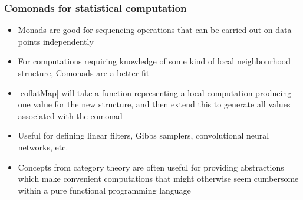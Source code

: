 \documentclass[mathserif,handout]{beamer}
\begin{document}
\begin{frame}[fragile]
  \frametitle{Comonads for statistical computation}
  \begin{itemize}
  \item Monads are good for sequencing operations that can be carried out on data points independently
    \item For computations requiring knowledge of some kind of local neighbourhood structure, \alert{Comonads} are a better fit
    \item |coflatMap| will take a function representing a \alert{local computation} producing one value for the new structure, and then extend this to generate all values associated with the comonad
      \item Useful for defining linear filters, Gibbs samplers, convolutional neural networks, etc.
\item Concepts from category theory are often useful for providing abstractions which make convenient computations that might otherwise seem cumbersome within a pure functional programming language
  \end{itemize}
\end{frame}
\end{document}
